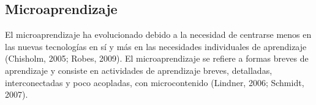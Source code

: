 \blindtext


\subsection{Microaprendizaje}
El microaprendizaje ha evolucionado debido a la necesidad de centrarse menos en las nuevas tecnologías en sí y más en
las necesidades individuales de aprendizaje (Chisholm, 2005; Robes, 2009). El microaprendizaje se refiere a formas breves
de aprendizaje y consiste en actividades de aprendizaje breves, detalladas, interconectadas y poco acopladas,
con microcontenido (Lindner, 2006; Schmidt, 2007).
\cite{article:microlearning_buchem}